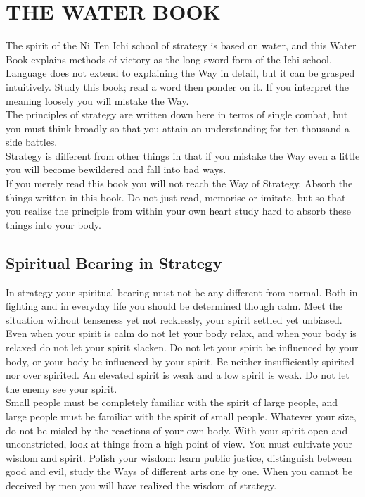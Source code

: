 \chapter{THE WATER BOOK}

The spirit of the Ni Ten Ichi school of strategy is based on water, and this Water Book explains methods of victory as the long-sword form of the Ichi school. Language does not extend to explaining the Way in detail, but it can be grasped intuitively. Study this book; read a word then ponder on it. If you interpret the meaning loosely you will mistake the Way.\\

The principles of strategy are written down here in terms of single combat, but you must think broadly so that you attain an understanding for ten-thousand-a-side battles.\\

Strategy is different from other things in that if you mistake the Way even a little you will become bewildered and fall into bad ways.\\

If you merely read this book you will not reach the Way of Strategy. Absorb the things written in this book. Do not just read, memorise or imitate, but so that you realize the principle from within your own heart study hard to absorb these things into your body.\\
\section{Spiritual Bearing in Strategy}

In strategy your spiritual bearing must not be any different from normal. Both in fighting and in everyday life you should be determined though calm. Meet the situation without tenseness yet not recklessly, your spirit settled yet unbiased. Even when your spirit is calm do not let your body relax, and when your body is relaxed do not let your spirit slacken. Do not let your spirit be influenced by your body, or your body be influenced by your spirit. Be neither insufficiently spirited nor over spirited. An elevated spirit is weak and a low spirit is weak. Do not let the enemy see your spirit.\\

Small people must be completely familiar with the spirit of large people, and large people must be familiar with the spirit of small people. Whatever your size, do not be misled by the reactions of your own body. With your spirit open and unconstricted, look at things from a high point of view. You must cultivate your wisdom and spirit. Polish your wisdom: learn public justice, distinguish between good and evil, study the Ways of different arts one by one. When you cannot be deceived by men you will have realized the wisdom of strategy.\\

